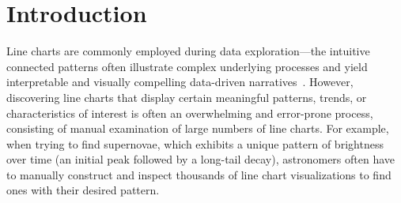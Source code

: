 \section{Introduction\label{sec:intro}}
 Line charts are commonly employed during data exploration---the intuitive connected patterns often illustrate complex underlying processes
 and yield interpretable and visually compelling data-driven narratives~\cite{Few2012}. 
 However, discovering line charts that display certain meaningful patterns, trends, or characteristics of interest is often  an overwhelming and error-prone process, consisting of manual examination of large numbers of line charts. For example, when trying to find supernovae, which exhibits a unique pattern of brightness over time (an initial peak followed by a long-tail decay), astronomers often have to manually construct and inspect thousands of line chart visualizations to find ones with their desired pattern.
